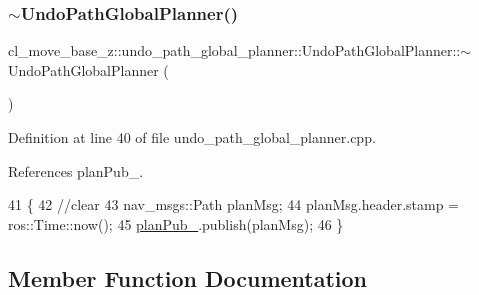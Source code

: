 \subsubsection{\texorpdfstring{$\sim$\+Undo\+Path\+Global\+Planner()}{~UndoPathGlobalPlanner()}}
{\footnotesize\ttfamily cl\+\_\+move\+\_\+base\+\_\+z\+::undo\+\_\+path\+\_\+global\+\_\+planner\+::\+Undo\+Path\+Global\+Planner\+::$\sim$\+Undo\+Path\+Global\+Planner (\begin{DoxyParamCaption}{ }\end{DoxyParamCaption})\hspace{0.3cm}{\ttfamily [virtual]}}



Definition at line 40 of file undo\+\_\+path\+\_\+global\+\_\+planner.\+cpp.



References plan\+Pub\+\_\+.


\begin{DoxyCode}
41         \{
42             \textcolor{comment}{//clear}
43             nav\_msgs::Path planMsg;
44             planMsg.header.stamp = ros::Time::now();
45             \hyperlink{classcl__move__base__z_1_1undo__path__global__planner_1_1UndoPathGlobalPlanner_a65bf364a122d5950baf1bf8b42309d68}{planPub\_}.publish(planMsg);
46         \}
\end{DoxyCode}


\subsection{Member Function Documentation}
\mbox{\label{classcl__move__base__z_1_1undo__path__global__planner_1_1UndoPathGlobalPlanner_a659c16f439d33ac7026a54bb65c26ca8}} 
